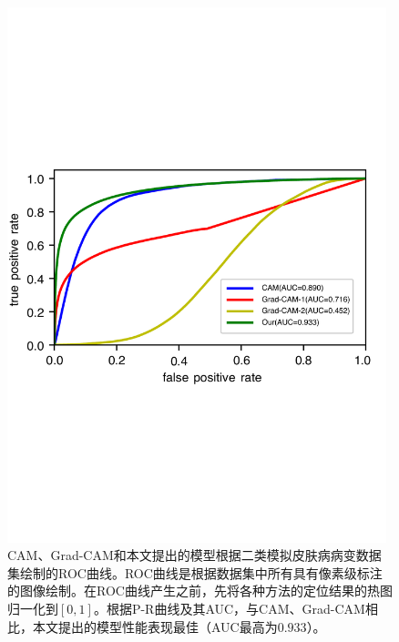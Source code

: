 \begin{figure}[h]
	\centering
	\includegraphics[width=0.98\textwidth]{figure/ROC_cam_grad_cam_our_simulated_skin_datasets}
	\caption{CAM、Grad-CAM和本文提出的模型根据二类模拟皮肤病病变数据集绘制的ROC曲线。ROC曲线是根据数据集中所有具有像素级标注的图像绘制。在ROC曲线产生之前，先将各种方法的定位结果的热图归一化到$[0, 1]$。根据P-R曲线及其AUC，与CAM、Grad-CAM相比，本文提出的模型性能表现最佳（AUC最高为$0.933$）。} 
	\label{fig:roc_cam_grad_cam_our_simulated_skin_datasets}
\end{figure}
\vspace{-1cm}
